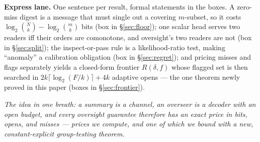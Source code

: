 \documentclass[11pt,a4paper]{article}
\newcommand{\onebreath}[1]{\begin{center}\emph{#1}\end{center}}
\begin{document}
\textbf{Express lane.} One sentence per result, formal statements in the boxes. A zero-miss digest is a message that must single out a covering $m$-subset, so it costs $\log_2\binom{N}{k}-\log_2\binom{m}{k}$ bits (box in \S\ref{sec:floor}); one scalar head serves two readers iff their orders are comonotone, and oversight's two readers are not (box in \S\ref{sec:split}); the inspect-or-pass rule is a likelihood-ratio test, making ``anomaly'' a calibration obligation (box in \S\ref{sec:regret}); and pricing misses and flags separately yields a closed-form frontier $R(\delta,f)$ whose flagged set is then searched in $2k\lceil\log_2(F/k)\rceil+4k$ adaptive opens --- the one theorem newly proved in this paper (boxes in \S\ref{sec:frontier}).

\onebreath{The idea in one breath: a summary is a channel, an overseer is a decoder with an open budget, and every oversight guarantee therefore has an exact price in bits, opens, and misses --- prices we compute, and one of which we bound with a new, constant-explicit group-testing theorem.}
\end{document}

